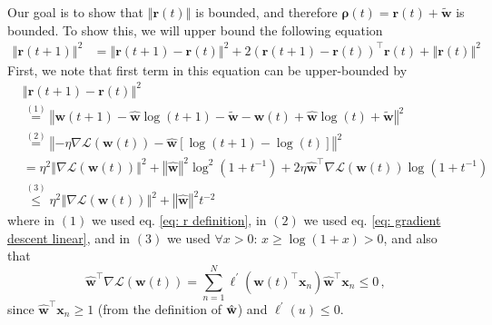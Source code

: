 \documentclass[twoside,11pt,english]{article}
\begin{document}
Our goal is to show that $\left\Vert \mathbf{r}\left(t\right)\right\Vert $
is bounded, and therefore $\boldsymbol{\rho}\left(t\right)=\mathbf{r}\left(t\right)+\tilde{\mathbf{w}}$
is bounded. To show this, we will upper bound the following equation
\begin{align}
\left\Vert \mathbf{r}\left(t+1\right)\right\Vert ^{2} & =\left\Vert \mathbf{r}\left(t+1\right)-\mathbf{r}\left(t\right)\right\Vert ^{2}+2\left(\mathbf{r}\left(t+1\right)-\mathbf{r}\left(t\right)\right)^{\top}\mathbf{r}\left(t\right)+\left\Vert \mathbf{r}\left(t\right)\right\Vert ^{2}\label{eq: r recursion}
\end{align}
First, we note that first term in this equation can be upper-bounded
by 
\begin{align}
 & \left\Vert \mathbf{r}\left(t+1\right)-\mathbf{r}\left(t\right)\right\Vert ^{2}\nonumber \\
 & \overset{\left(1\right)}{=}\left\Vert \mathbf{w}\left(t+1\right)-\hat{\mathbf{w}}\log\left(t+1\right)-\tilde{\mathbf{w}}-\mathbf{w}\left(t\right)+\hat{\mathbf{w}}\log\left(t\right)+\tilde{\mathbf{w}}\right\Vert ^{2}\nonumber \\
 & \overset{\left(2\right)}{=}\left\Vert -\eta\nabla\mathcal{L}\left(\mathbf{w}\left(t\right)\right)-\hat{\mathbf{w}}\left[\log\left(t+1\right)-\log\left(t\right)\right]\right\Vert ^{2}\nonumber \\
 & =\eta^{2}\left\Vert \nabla\mathcal{L}\left(\mathbf{w}\left(t\right)\right)\right\Vert ^{2}+\left\Vert \hat{\mathbf{w}}\right\Vert ^{2}\log^{2}\left(1+t^{-1}\right)+2\eta\hat{\mathbf{w}}^{\top}\nabla\mathcal{L}\left(\mathbf{w}\left(t\right)\right)\log\left(1+t^{-1}\right)\nonumber \\
 & \overset{\left(3\right)}{\leq}\eta^{2}\left\Vert \nabla\mathcal{L}\left(\mathbf{w}\left(t\right)\right)\right\Vert ^{2}+\left\Vert \hat{\mathbf{w}}\right\Vert ^{2}t^{-2}\label{eq: square r difference}
\end{align}
where in $\left(1\right)$ we used eq. \ref{eq: r definition},
in $\left(2\right)$ we used eq. \ref{eq: gradient descent linear},
and in $\left(3\right)$ we used $\forall x>0:\,x\geq\log\left(1+x\right)>0$,
and also that 
\begin{equation}
\hat{\mathbf{w}}^{\top}\nabla\mathcal{L}\left(\mathbf{w}\left(t\right)\right)=\sum_{n=1}^{N}\ell^{\prime}\left(\mathbf{w}\left(t\right)^{\top}\mathbf{x}_{n}\right)\hat{\mathbf{w}}^{\top}\mathbf{x}_{n}\leq0\,,
\end{equation}
since $\hat{\mathbf{w}}^{\top}\mathbf{x}_{n}\geq1$ (from the definition
of $\hat{\mathbf{w}}$) and $\ell^{\prime}(u)\leq0$.
\end{document}
